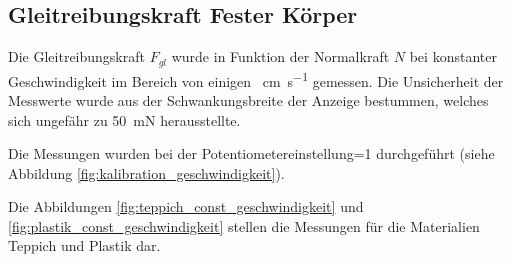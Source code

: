 

\subsection{Gleitreibungskraft Fester K\"orper}

Die  Gleitreibungskraft  $F_{gl}$  wurde  in  Funktion der Normalkraft  $N$  bei
konstanter Geschwindigkeit im Bereich von einigen \SI{}{\centi\meter\per\second}
gemessen. Die Unsicherheit der Messwerte wurde  aus  der  Schwankungsbreite  der
Anzeige   bestummen,   welches   sich   ungef\"ahr   zu   \SI{50}{\milli\newton}
herausstellte.

Die  Messungen  wurden bei der Potentiometereinstellung=1 durchgef\"uhrt  (siehe
Abbildung \ref{fig:kalibration_geschwindigkeit}).

Die        Abbildungen        \ref{fig:teppich_const_geschwindigkeit}        und
\ref{fig:plastik_const_geschwindigkeit}  stellen   die   Messungen   f\"ur   die
Materialien Teppich und Plastik dar.

